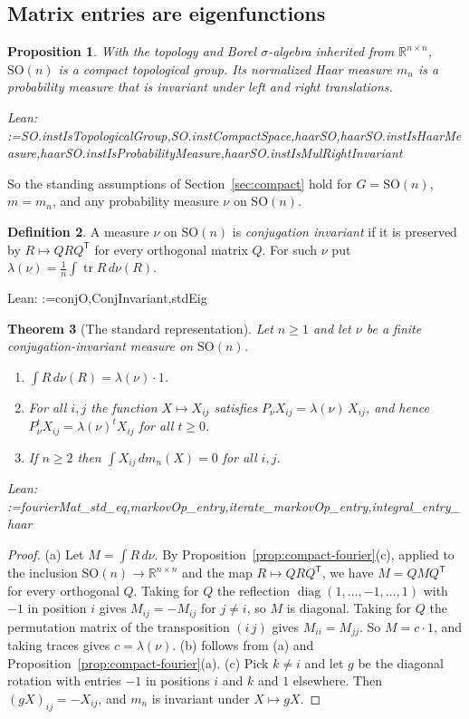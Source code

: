 \documentclass[11pt]{amsart}
\makeatletter
\newtheorem{theorem}{Theorem}[section]
\newtheorem{proposition}[theorem]{Proposition}
\theoremstyle{definition}
\newtheorem{definition}[theorem]{Definition}
\theoremstyle{remark}
\newcommand{\@leanlist}[1]{\def\@leansep{}\@for\@leanname:=#1\do{\@leansep
  \texttt{\expandafter\detokenize\expandafter{\@leanname}}\def\@leansep{, }}}
\newcommand{\lean}[1]{\par\smallskip\noindent
  {\footnotesize\normalfont\raggedright\textsf{Lean:} \@leanlist{#1}\par}}
\newcommand{\R}{\mathbb{R}}
\newcommand{\SO}{\mathrm{SO}}
\newcommand{\tr}{\operatorname{tr}}
\newcommand{\transp}{^{\mathsf T}}
\makeatother
\begin{document}
\subsection{Matrix entries are eigenfunctions}
\begin{proposition}\label{prop:son-haar}
With the topology and Borel $\sigma$-algebra inherited from $\R^{n\times n}$, $\SO(n)$ is a
compact topological group.  Its normalized Haar measure $m_n$ is a probability measure that is
invariant under left and right translations.
\lean{SO.instIsTopologicalGroup,SO.instCompactSpace,haarSO,haarSO.instIsHaarMeasure,haarSO.instIsProbabilityMeasure,haarSO.instIsMulRightInvariant}
\end{proposition}

So the standing assumptions of Section~\ref{sec:compact} hold for $G=\SO(n)$, $m=m_n$, and any
probability measure $\nu$ on $\SO(n)$.

\begin{definition}\label{def:conj}
A measure $\nu$ on $\SO(n)$ is \emph{conjugation invariant} if it is preserved by
$R\mapsto QRQ\transp$ for every orthogonal matrix $Q$.  For such $\nu$ put
$\lambda(\nu)=\frac1n\int\tr R\,d\nu(R)$.
\lean{conjO,ConjInvariant,stdEig}
\end{definition}

\begin{theorem}[The standard representation]\label{thm:entries}
Let $n\ge1$ and let $\nu$ be a finite conjugation-invariant measure on $\SO(n)$.
\begin{enumerate}
\item[(a)] $\int R\,d\nu(R)=\lambda(\nu)\cdot1$.
\item[(b)] For all $i,j$ the function $X\mapsto X_{ij}$ satisfies
$P_\nu X_{ij}=\lambda(\nu)\,X_{ij}$, and hence $P_\nu^tX_{ij}=\lambda(\nu)^tX_{ij}$ for all
$t\ge0$.
\item[(c)] If $n\ge2$ then $\int X_{ij}\,dm_n(X)=0$ for all $i,j$.
\end{enumerate}
\lean{fourierMat_std_eq,markovOp_entry,iterate_markovOp_entry,integral_entry_haar}
\end{theorem}

\begin{proof}
(a) Let $M=\int R\,d\nu$.  By Proposition~\ref{prop:compact-fourier}(c), applied to the inclusion
$\SO(n)\to\R^{n\times n}$ and the map $R\mapsto QRQ\transp$, we have $M=QMQ\transp$ for every
orthogonal $Q$.  Taking for $Q$ the reflection $\operatorname{diag}(1,\dots,-1,\dots,1)$ with
$-1$ in position $i$ gives $M_{ij}=-M_{ij}$ for $j\ne i$, so $M$ is diagonal.  Taking for $Q$
the permutation matrix of the transposition $(i\,j)$ gives $M_{ii}=M_{jj}$.  So $M=c\cdot1$, and
taking traces gives $c=\lambda(\nu)$.  (b) follows from (a) and
Proposition~\ref{prop:compact-fourier}(a).  (c) Pick $k\ne i$ and let $g$ be the diagonal
rotation with entries $-1$ in positions $i$ and $k$ and $1$ elsewhere.  Then
$(gX)_{ij}=-X_{ij}$, and $m_n$ is invariant under $X\mapsto gX$.
\end{proof}
\end{document}
